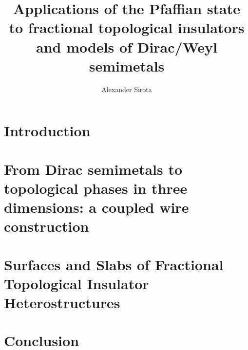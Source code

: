 \documentclass[prc,preprint,showpacs,eqsecnum,superscriptaddress,floatfix]{revtex4-1}
\begin{document}
	\title{Applications of the Pfaffian state to fractional topological insulators and models of Dirac/Weyl semimetals}
	\author{Alexander Sirota}
	\begin{abstract}
		
	\end{abstract}
\maketitle %
{ %
	\hypersetup{linkcolor=black}
	\tableofcontents
}

\section{Introduction}

%
\section{From Dirac semimetals to topological phases in three dimensions: a coupled wire construction}

\section{Surfaces and Slabs of Fractional Topological Insulator Heterostructures}

\section{Conclusion}




\end{document}

